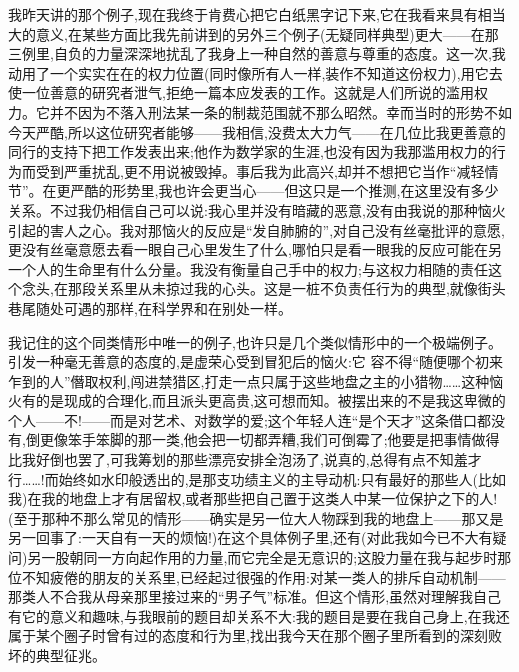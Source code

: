 我昨天讲的那个例子,现在我终于肯费心把它白纸黑字记下来,它在我看来具有相当大的意义,在某些方面比我先前讲到的另外三个例子(无疑同样典型)更大——在那三例里,自负的力量深深地扰乱了我身上一种自然的善意与尊重的态度。这一次,我动用了一个实实在在的权力位置(同时像所有人一样,装作不知道这份权力),用它去使一位善意的研究者泄气,拒绝一篇本应发表的工作。这就是人们所说的滥用权力。它并不因为不落入刑法某一条的制裁范围就不那么昭然。幸而当时的形势不如今天严酷,所以这位研究者能够——我相信,没费太大力气——在几位比我更善意的同行的支持下把工作发表出来;他作为数学家的生涯,也没有因为我那滥用权力的行为而受到严重扰乱,更不用说被毁掉。事后我为此高兴,却并不想把它当作“减轻情节”。在更严酷的形势里,我也许会更当心——但这只是一个推测,在这里没有多少关系。不过我仍相信自己可以说:我心里并没有暗藏的恶意,没有由我说的那种恼火引起的害人之心。我对那恼火的反应是“发自肺腑的”,对自己没有丝毫批评的意愿,更没有丝毫意愿去看一眼自己心里发生了什么,哪怕只是看一眼我的反应可能在另一个人的生命里有什么分量。我没有衡量自己手中的权力;与这权力相随的责任这个念头,在那段关系里从未掠过我的心头。这是一桩不负责任行为的典型,就像街头巷尾随处可遇的那样,在科学界和在别处一样。

我记住的这个同类情形中唯一的例子,也许只是几个类似情形中的一个极端例子。引发一种毫无善意的态度的,是虚荣心受到冒犯后的恼火:它
%
 容不得“随便哪个初来乍到的人”僭取权利,闯进禁猎区,打走一点只属于这些地盘之主的小猎物……这种恼火有的是现成的合理化,而且派头更高贵,这可想而知。被摆出来的不是我这卑微的个人——不!——而是对艺术、对数学的爱;这个年轻人连“是个天才”这条借口都没有,倒更像笨手笨脚的那一类,他会把一切都弄糟,我们可倒霉了;他要是把事情做得比我好倒也罢了,可我筹划的那些漂亮安排全泡汤了,说真的,总得有点不知羞才行……!而始终如水印般透出的,是那支功绩主义的主导动机:只有最好的那些人(比如我)在我的地盘上才有居留权,或者那些把自己置于这类人中某一位保护之下的人!(至于那种不那么常见的情形——确实是另一位大人物踩到我的地盘上——那又是另一回事了:一天自有一天的烦恼!)在这个具体例子里,还有(对此我如今已不大有疑问)另一股朝同一方向起作用的力量,而它完全是无意识的;这股力量在我与起步时那位不知疲倦的朋友的关系里,已经起过很强的作用:对某一类人的排斥自动机制——那类人不合我从母亲那里接过来的“男子气”标准。但这个情形,虽然对理解我自己有它的意义和趣味,与我眼前的题目却关系不大:我的题目是要在我自己身上,在我还属于某个圈子时曾有过的态度和行为里,找出我今天在那个圈子里所看到的深刻败坏的典型征兆。


